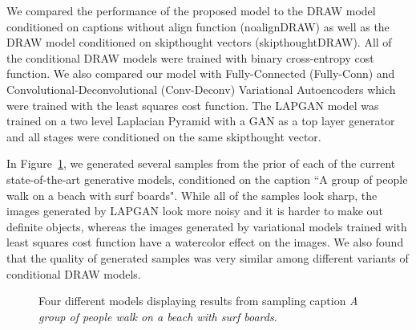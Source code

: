 \documentclass{article} %
\begin{document}
We compared the performance of the proposed model to the DRAW model conditioned on captions without align function (noalignDRAW) as well as the DRAW model conditioned on skipthought vectors \citep{kiros_skipthought} (skipthoughtDRAW). All of the conditional DRAW models were trained with binary cross-entropy cost function. We also compared our model with Fully-Connected (Fully-Conn) and Convolutional-Deconvolutional (Conv-Deconv) Variational Autoencoders which were trained with the least squares cost function. The LAPGAN model was trained on a two level Laplacian Pyramid with a GAN as a top layer generator and all stages were conditioned on the same skipthought vector.

In Figure~\ref{fig:diffmodels}, we generated several samples from the prior of each of the current state-of-the-art generative models, conditioned on the caption ``A group of people walk on a beach with surf boards". While all of the samples look sharp, the images generated by LAPGAN look more noisy and it is harder to make out definite objects, whereas the images generated by variational models trained with least squares cost function have a watercolor effect on the images. We also found that the quality of generated samples was very similar among different variants of conditional DRAW models.

\begin{figure}[!h]
\captionsetup[subfigure]{labelformat=empty}
\vspace{-0.3cm}
\begin{center}
\quad
%
\quad
%
\quad
%
\quad
%
\end{center}
\caption{Four different models displaying results from sampling caption \textit{A group of people walk on a beach with surf boards.}}
\label{fig:diffmodels}
\vspace{-0.3cm}
\end{figure}
\end{document}
